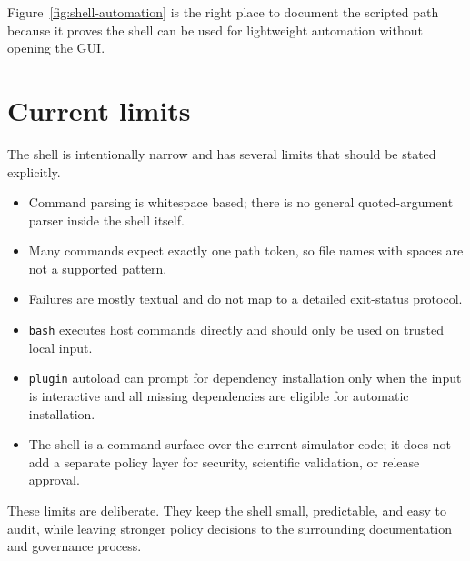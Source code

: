 Figure~\ref{fig:shell-automation} is the right place to document the scripted
path because it proves the shell can be used for lightweight automation without
opening the GUI.

\section{Current limits}
\label{sec:shell-limits}

The shell is intentionally narrow and has several limits that should be stated
explicitly.
\begin{itemize}
\item Command parsing is whitespace based; there is no general quoted-argument
parser inside the shell itself.
\item Many commands expect exactly one path token, so file names with spaces are
not a supported pattern.
\item Failures are mostly textual and do not map to a detailed exit-status
protocol.
\item \texttt{bash} executes host commands directly and should only be used on
trusted local input.
\item \texttt{plugin} autoload can prompt for dependency installation only when
the input is interactive and all missing dependencies are eligible for
automatic installation.
\item The shell is a command surface over the current simulator code; it does
not add a separate policy layer for security, scientific validation, or release
approval.
\end{itemize}

These limits are deliberate. They keep the shell small, predictable, and easy
to audit, while leaving stronger policy decisions to the surrounding
documentation and governance process.
